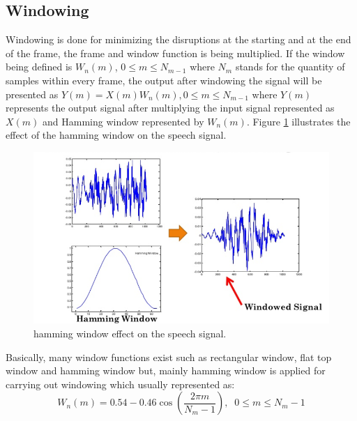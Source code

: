 \documentclass[12pt, a4paper, twoside]{report}
\begin{document}
\subsection{Windowing}
Windowing   is done for  minimizing  the  disruptions  at  the  starting  and  at  the  end  of  the  frame, the frame and window function is being multiplied. If the window being defined is $W_n(m)$, $0 \leq m \leq N_{m-1}$ where $N_m$ stands for the quantity of samples within every frame, the output after windowing the signal will be presented as $Y(m) = X(m)W_n(m), 0 ≤ m ≤ N_{m-1}$ where $Y(m)$ represents the output signal after multiplying the input signal represented as $X(m)$ and Hamming window represented by $W_n(m)$. Figure \ref{fig:hamming} illustrates the  effect of the hamming window on the speech signal.
\begin{figure}[!h]
	\centering
	\includegraphics[width=1\textwidth]
	{images/chapter3/hamming}
	\caption{hamming window effect on the speech signal.}
	\label{fig:hamming}
\end{figure}

Basically,  many  window  functions  exist  such  as  rectangular  window,  flat  top  window  and  hamming window  but,  mainly  hamming  window  is  applied  for  carrying  out  windowing  which  usually represented as:
\begin{equation}
W_n(m) = 0.54 - 0.46\cos \left ( \frac{2\pi m}{N_m -1} \right ), \; \; 0 \leq m\leq N_m -1
\end{equation}
\end{document}
